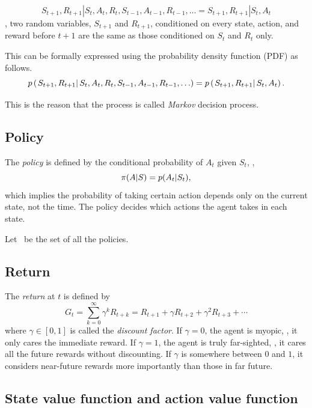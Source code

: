 \begin{equation}
S_{t+1}, R_{t+1} | S_{t}, A_{t}, R_{t}, S_{t-1}, A_{t-1}, R_{t-1}, \ldots
= S_{t+1}, R_{t+1} | S_{t}, A_{t}
\end{equation}
\ie, two random variables, $S_{t+1}$ and $R_{t+1}$, conditioned on every state, action, and reward before $t+1$
are the same as those conditioned on $S_t$ and $R_t$ only.

This can be formally expressed using the probability density function (PDF)
as follows.
\begin{equation}
p\left(\left.S_{t+1}, R_{t+1} \right| S_{t}, A_{t}, R_{t}, S_{t-1}, A_{t-1}, R_{t-1}, \ldots\right)
= p\left(\left.S_{t+1}, R_{t+1} \right| S_{t}, A_{t} \right).
\end{equation}

This is the reason that the process is called \emph{Markov} decision process.

\subsection{Policy}

The \emph{policy} is defined by the conditional probability of $A_{t}$ given $S_{t}$,
\ie,
\begin{equation}
\pi(A|S) = p(A_t|S_t),
\end{equation}
which implies the probability of taking certain action depends only on the current state, not the time.
The policy decides which actions the agent takes in each state.

Let \polset\ be the set of all the policies.

\subsection{Return}

The \emph{return} at $t$ is defined by
\begin{equation}
        G_t
        = \sum_{k=0}^\infty \gamma^k R_{t+k}
        = R_{t+1} + \gamma R_{t+2} + \gamma^2 R_{t+3} + \cdots
\end{equation}
where $\gamma \in [0,1]$ is called the \emph{discount factor}.
If $\gamma=0$, the agent is myopic, \ie, it only cares the immediate reward.
If $\gamma=1$, the agent is truly far-sighted, \ie, it cares all the future rewards without discounting.
If $\gamma$ is somewhere between $0$ and $1$, it considers near-future rewards more importantly than those in far future.


\subsection{State value function and action value function}

